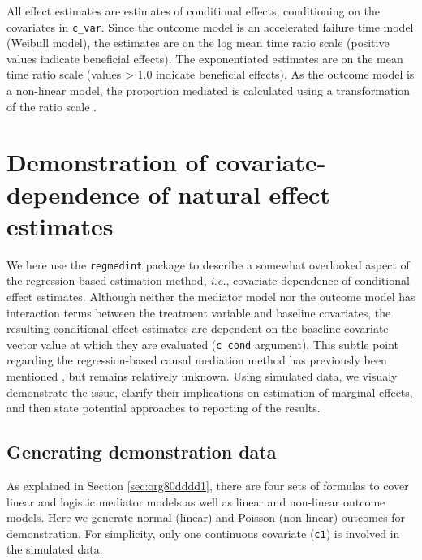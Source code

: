 \documentclass[10pt]{article}
\begin{document}
\normalsize

All effect estimates are estimates of conditional effects, conditioning on the covariates in \texttt{c\_var}. Since the outcome model is an accelerated failure time model (Weibull model), the estimates are on the log mean time ratio scale (positive values indicate beneficial effects). The exponentiated estimates are on the mean time ratio scale (values > 1.0 indicate beneficial effects). As the outcome model is a non-linear model, the proportion mediated is calculated using a transformation of the ratio scale \cite{vanderweeleOddsRatiosMediation2010}.

\section{Demonstration of covariate-dependence of natural effect estimates}
\label{sec:orgfe9af71}
We here use the \texttt{regmedint} package to describe a somewhat overlooked aspect of the regression-based estimation method, \textit{i.e.}, covariate-dependence of conditional effect estimates. Although neither the mediator model nor the outcome model has interaction terms between the treatment variable and baseline covariates, the resulting conditional effect estimates are dependent on the baseline covariate vector value at which they are evaluated (\texttt{c\_cond} argument). This subtle point regarding the regression-based causal mediation method has previously been mentioned \cite{steenFlexibleMediationAnalysis2017,starkopfComparisonFiveSoftware2017}, but remains relatively unknown. Using simulated data, we visualy demonstrate the issue, clarify their implications on estimation of marginal effects, and then state potential approaches to reporting of the results.

\subsection{Generating demonstration data}
\label{sec:org3e11eaa}
As explained in Section \ref{sec:org80dddd1}, there are four sets of formulas to cover linear and logistic mediator models as well as linear and non-linear outcome models. Here we generate normal (linear) and Poisson (non-linear) outcomes for demonstration. For simplicity, only one continuous covariate (\texttt{c1}) is involved in the simulated data.
\end{document}
